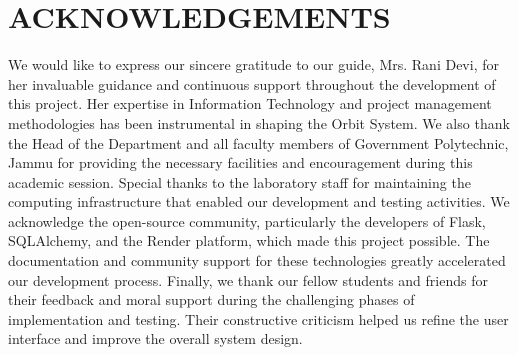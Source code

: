﻿\documentclass[12pt]{article}
\def\normaltext{\fontsize{12pt}{18pt}\color{secondary}}
\begin{document}
\section*{{\color{primary}ACKNOWLEDGEMENTS}}
\normaltext
We would like to express our sincere gratitude to our guide, Mrs. Rani Devi, for her invaluable guidance and continuous support throughout the development of this project. Her expertise in Information Technology and project management methodologies has been instrumental in shaping the Orbit System.
\medskip
We also thank the Head of the Department and all faculty members of Government Polytechnic, Jammu for providing the necessary facilities and encouragement during this academic session. Special thanks to the laboratory staff for maintaining the computing infrastructure that enabled our development and testing activities.
\medskip
We acknowledge the open-source community, particularly the developers of Flask, SQLAlchemy, and the Render platform, which made this project possible. The documentation and community support for these technologies greatly accelerated our development process.
\medskip
Finally, we thank our fellow students and friends for their feedback and moral support during the challenging phases of implementation and testing. Their constructive criticism helped us refine the user interface and improve the overall system design.
\newpage

\end{document}
